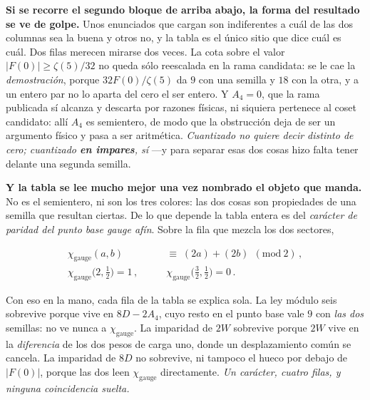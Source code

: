 \documentclass[11pt,a4paper]{article}
\newenvironment{keyeq}
  {\begin{center}\setlength{\fboxsep}{9pt}\setlength{\fboxrule}{0.8pt}%
   \begin{lrbox}{\keyeqbox}\begin{minipage}{0.88\textwidth}}
  {\end{minipage}\end{lrbox}%
   \fcolorbox{hdrblue!55}{hdrblue!6}{\usebox{\keyeqbox}}\end{center}}
\begin{document}
\begin{itemize}
\noindent \textbf{Si se recorre el segundo bloque de arriba abajo, la forma del resultado se ve de
golpe.} Unos enunciados que cargan son indiferentes a cuál de las dos columnas sea la buena y otros
no, y la tabla es el único sitio que dice cuál es cuál. Dos filas merecen mirarse dos veces. La cota
sobre el valor $|F(0)|\ge\zeta(5)/32$ no queda sólo reescalada en la rama candidata: se le cae la
\emph{demostración}, porque $32F(0)/\zeta(5)$ da $9$ con una semilla y $18$ con la otra, y a un
entero par no lo aparta del cero el ser entero. Y $A_4=0$, que la rama publicada sí alcanza y
descarta por razones físicas, ni siquiera pertenece al coset candidato: allí $A_4$ es semientero, de
modo que la obstrucción deja de ser un argumento físico y pasa a ser aritmética. \emph{Cuantizado no
quiere decir distinto de cero; cuantizado \textbf{en impares}, sí} ---y para separar esas dos cosas
hizo falta tener delante una segunda semilla.

\noindent \textbf{Y la tabla se lee mucho mejor una vez nombrado el objeto que manda.} No es el
semientero, ni son los tres colores: las dos cosas son propiedades de una semilla que resultan
ciertas. De lo que depende la tabla entera es del \emph{carácter de paridad del punto base gauge
afín}. Sobre la fila que mezcla los dos sectores,
\begin{keyeq}
\begin{equation}\label{eq:chigauge}
  \begin{aligned}
    \chi_{\mathrm{gauge}}(a,b)\;&\equiv\;(2a)+(2b)\ \ (\mathrm{mod}\ 2)\,,\\[2pt]
    \chi_{\mathrm{gauge}}\bigl(2,\tfrac12\bigr)=1\,,\qquad
    &\chi_{\mathrm{gauge}}\bigl(\tfrac32,\tfrac12\bigr)=0\,.
  \end{aligned}
\end{equation}
\end{keyeq}
\noindent Con eso en la mano, cada fila de la tabla se explica sola. La ley módulo seis sobrevive
porque vive en $8D-2A_4$, cuyo resto en el punto base vale $9$ con \emph{las dos} semillas: no ve
nunca a $\chi_{\mathrm{gauge}}$. La imparidad de $2W$ sobrevive porque $2W$ vive en la
\emph{diferencia} de los dos pesos de carga uno, donde un desplazamiento común se cancela. La
imparidad de $8D$ no sobrevive, ni tampoco el hueco por debajo de $|F(0)|$, porque las dos leen
$\chi_{\mathrm{gauge}}$ directamente. \emph{Un carácter, cuatro filas, y ninguna coincidencia
suelta.}


\end{itemize}
\end{document}
